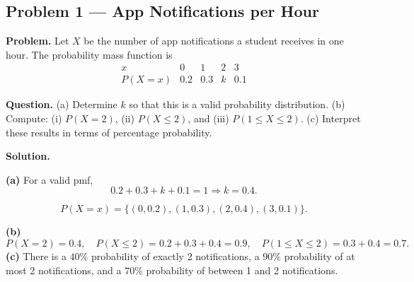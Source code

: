 


	
	
	\begin{ExamProblems}
		\item
		\subsection*{Problem 1 — App Notifications per Hour}
		
		\textbf{Problem.}
		Let $X$ be the number of app notifications a student receives in one hour. The probability mass function is
		\[
		\begin{array}{c|cccc}
			x & 0 & 1 & 2 & 3\\
			\hline
			P(X=x) & 0.2 & 0.3 & k & 0.1
		\end{array}
		\]
		
		\textbf{Question.}
		(a) Determine $k$ so that this is a valid probability distribution.
		(b) Compute: (i) $P(X=2)$, (ii) $P(X\le 2)$, and (iii) $P(1\le X\le 2)$.
		(c) Interpret these results in terms of percentage probability.
		
		\textbf{Solution.}

		\textbf{(a)} For a valid pmf,
		\[
		0.2+0.3+k+0.1=1\Rightarrow k=0.4.
		\]

		
\[
		P(X=x)=\{(0,0.2),(1,0.3),(2,0.4),(3,0.1)\}.
		\]
\begin{center}
		\end{center}
\textbf{(b)}
		\[
		P(X=2)=0.4,\quad
		P(X\le 2)=0.2+0.3+0.4=0.9,\quad
		P(1\le X\le 2)=0.3+0.4=0.7.
		\]
		\textbf{(c)} There is a $40\%$ probability of exactly 2 notifications, a $90\%$ probability of at most 2 notifications, and a $70\%$ probability of between 1 and 2 notifications.
		

\end{ExamProblems}
